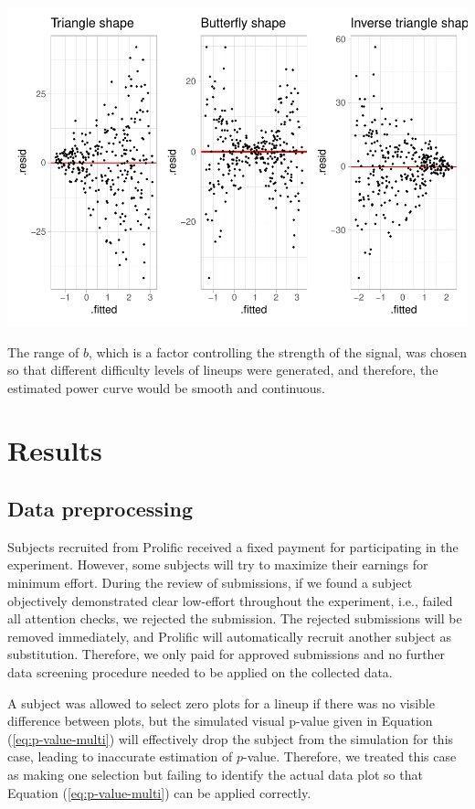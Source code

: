\documentclass[]{interact}
\theoremstyle{plain}%
\theoremstyle{definition}
\theoremstyle{remark}
\begin{document}
\includegraphics{paper_comparison_files/figure-latex/different-shape-of-heter-1.pdf}

The range of \(b\), which is a factor controlling the strength of the
signal, was chosen so that different difficulty levels of lineups were
generated, and therefore, the estimated power curve would be smooth and
continuous.

\hypertarget{results}{%
\section{Results}\label{results}}

\hypertarget{data-preprocessing}{%
\subsection{Data preprocessing}\label{data-preprocessing}}

Subjects recruited from Prolific received a fixed payment for
participating in the experiment. However, some subjects will try to
maximize their earnings for minimum effort. During the review of
submissions, if we found a subject objectively demonstrated clear
low-effort throughout the experiment, i.e., failed all attention checks,
we rejected the submission. The rejected submissions will be removed
immediately, and Prolific will automatically recruit another subject as
substitution. Therefore, we only paid for approved submissions and no
further data screening procedure needed to be applied on the collected
data.

A subject was allowed to select zero plots for a lineup if there was no
visible difference between plots, but the simulated visual p-value given
in Equation (\ref{eq:p-value-multi}) will effectively drop the subject
from the simulation for this case, leading to inaccurate estimation of
\(p\)-value. Therefore, we treated this case as making one selection but
failing to identify the actual data plot so that Equation
(\ref{eq:p-value-multi}) can be applied correctly.
\end{document}
